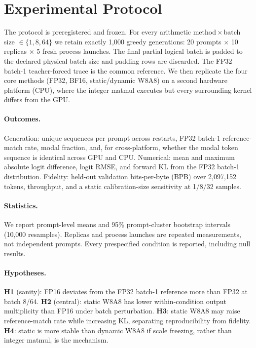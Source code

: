 \documentclass[wcp]{jmlr}
\begin{document}
\section{Experimental Protocol}
The protocol is preregistered and frozen. For every arithmetic
method\,$\times$\,batch size $\in\{1,8,64\}$ we retain exactly 1{,}000 greedy
generations: 20 prompts $\times$ 10 replicas $\times$ 5 fresh process launches. The
final partial logical batch is padded to the declared physical batch size and
padding rows are discarded. The FP32 batch-1 teacher-forced trace is the common
reference. We then replicate the four core methods (FP32, BF16, static/dynamic W8A8)
on a second hardware platform (CPU), where the integer matmul executes but every
surrounding kernel differs from the GPU.

\paragraph{Outcomes.} Generation: unique sequences per prompt across restarts, FP32
batch-1 reference-match rate, modal fraction, and, for cross-platform, whether the
modal token sequence is identical across GPU and CPU. Numerical: mean and maximum
absolute logit difference, logit RMSE, and forward KL from the FP32 batch-1
distribution. Fidelity: held-out validation bits-per-byte (BPB) over 2{,}097{,}152
tokens, throughput, and a static calibration-size sensitivity at 1/8/32 samples.

\paragraph{Statistics.} We report prompt-level means and 95\% prompt-cluster
bootstrap intervals (10{,}000 resamples). Replicas and process launches are repeated
measurements, not independent prompts. Every prespecified condition is reported,
including null results.

\paragraph{Hypotheses.} \textbf{H1} (sanity): FP16 deviates from the FP32 batch-1
reference more than FP32 at batch 8/64. \textbf{H2} (central): static W8A8 has lower
within-condition output multiplicity than FP16 under batch perturbation.
\textbf{H3}: static W8A8 may raise reference-match rate while increasing KL,
separating reproducibility from fidelity. \textbf{H4}: static is more stable than
dynamic W8A8 if scale freezing, rather than integer matmul, is the mechanism.
\end{document}
